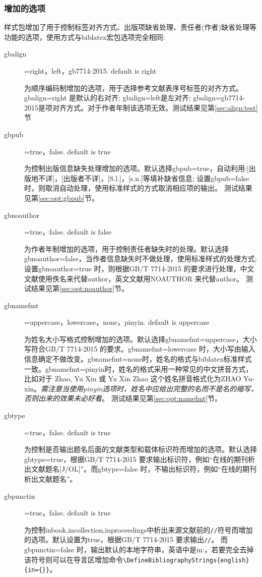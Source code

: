 \subsubsection{增加的选项}\label{sec:added:opt}
样式包增加了用于控制标签对齐方式、出版项缺省处理、责任者(作者)缺省处理等功能的选项，使用方式与biblatex宏包选项完全相同:
\begin{description}
  \item[gbalign]=right，left，gb7714-2015. \hfill default is right

  为顺序编码制增加的选项，用于选择参考文献表序号标签的对齐方式。gbalign=right 是默认的右对齐; gbalign=left是左对齐; gbalign=gb7714-2015是项对齐方式。对于作者年制该选项无效。测试结果见第\ref{sec:align:test}节

  \item[gbpub]=true，false. \hfill default is true

  为控制出版信息缺失处理增加的选项。默认选择gbpub=true，自动利用:[出版地不详]，[出版者不详]，[S.l.]，[s.n.]等填补缺省信息; 设置gbpub=false 时，则取消自动处理，使用标准样式的方式取消相应项的输出。
  测试结果见第\ref{sec:opt:gbpub}节。

  \item[gbnoauthor]=true，false. \hfill default is false

  为作者年制增加的选项，用于控制责任者缺失时的处理。默认选择gbnoauthor=false，当作者信息缺失时不做处理，使用标准样式的处理方式; 设置gbnoauthor=true 时，则根据GB/T 7714-2015 的要求进行处理，中文文献使用佚名来代替author，英文文献用NOAUTHOR 来代替author。
  测试结果见第\ref{sec:opt:noauthor}节。

  \item[gbnamefmt]=uppercase，lowercase，none，pinyin. \hfill default is uppercase

  为姓名大小写格式控制增加的选项。默认选择gbnamefmt=uppercase，大小写符合GB/T 7714-2015 的要求。gbnamefmt=lowercase 时，大小写由输入信息确定不做改变。gbnamefmt=none时，姓名的格式与biblatex标准样式一致。gbnamefmt=pinyin时，姓名的格式采用一种常见的中文拼音方式，比如对于 Zhao, Yu Xin 或 Yu Xin Zhao 这个姓名拼音格式化为ZHAO Yu-xin。\emph{需注意当使用pinyin选项时，姓名中应给出完整的名而不是名的缩写，否则出来的效果未必好看}。
  测试结果见第\ref{sec:opt:namefmt}节。

  \item[gbtype]=true，false. \hfill default is true

  为控制是否输出题名后面的文献类型和载体标识符而增加的选项。默认选择gbtype=true，根据GB/T 7714-2015 要求输出标识符，例如“在线的期刊析出文献题名[J/OL]”。而gbtype=false 时，不输出标识符，例如“在线的期刊析出文献题名”。

  \item[gbpunctin]=true，false. \hfill default is true

  为控制inbook,incollection,inproceedings中析出来源文献前的\texttt{//}符号而增加的选项。默认设置为true，根据GB/T 7714-2015 要求输出\texttt{//}。 而gbpunctin=false 时，输出默认的本地字符串，英语中是in:，若要完全去掉该符号则可以在导言区增加命令\lstinline!\DefineBibliographyStrings{english}{in={}}!。
\end{description}


